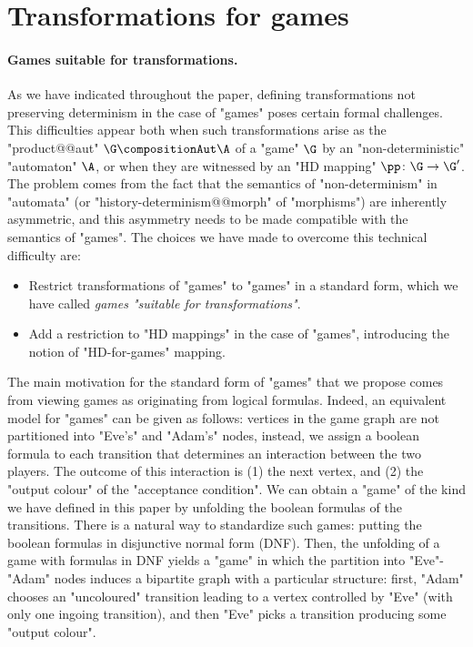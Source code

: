 \documentclass{theoretics}
\begin{document}
 	
	\section{Transformations for games}
	\label{sec:appendix-games-transformations}
	\paragraph*{Games suitable for transformations.}
As we have indicated throughout the paper, defining transformations not preserving determinism in the case of "games" poses certain formal challenges. This difficulties appear both when  such transformations arise as the "product@@aut" $\G \compositionAut \A$ of a "game" $\G$ by an "non-deterministic" "automaton" $\A$, or when they are witnessed by an "HD mapping" $\pp\colon \G \to \G'$. The problem comes from the fact that the semantics of "non-determinism" in "automata" (or "history-determinism@@morph" of "morphisms") are inherently asymmetric,  and this asymmetry needs to be made compatible with the semantics of "games". 
The choices we have made to overcome this technical difficulty are:
\begin{itemize}
	\item Restrict transformations of "games" to "games" in a standard form, which we have called \emph{games "suitable for transformations"}.
	\item Add a restriction to "HD mappings" in the case of "games", introducing the notion of "HD-for-games" mapping. 
\end{itemize}

The main motivation for the standard form of "games" that we propose comes from viewing games as originating from logical formulas. Indeed, an equivalent model for "games" can be given as follows: vertices in the game graph are not partitioned into "Eve's" and "Adam's" nodes, instead, we assign a boolean formula to each transition that determines an interaction between the two players. The outcome of this interaction is (1) the next vertex, and (2) the "output colour" of the "acceptance condition". We can obtain a "game" of the kind we have defined in this paper by unfolding the boolean formulas of the transitions. There is a natural way to standardize such games: putting the boolean formulas in disjunctive normal form (DNF). Then, the unfolding of a game with formulas in DNF yields a "game" in which the partition into "Eve"-"Adam" nodes induces a bipartite graph with a particular structure: first, "Adam" chooses an "uncoloured" transition leading to a vertex controlled by "Eve" (with only one ingoing transition), and then "Eve" picks a transition producing some "output colour".
\end{document}
